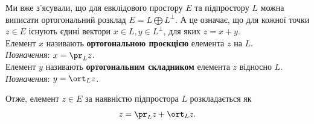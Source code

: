 \documentclass{math_library}
\begin{document}
\begin{definition}
Ми вже з'ясували, що для евклідового простору $E$ та підпростору $L$ можна виписати ортогональний розклад $E = L \bigoplus L^\perp$. А це означає, що для кожної точки $z \in E$ існують єдині вектори $x \in L, y \in L^\perp$, для яких $z = x+y$.\\
Елемент $x$ називають \textbf{ортогональною проєкцією} елемента $z$ на $L$.\\
\textit{Позначення}: $x = \pr_L z$.\\
Елемент $y$ називають \textbf{ортогональним складником} елемента $z$ відносно $L$.\\
\textit{Позначення}: $y = \ort_L z$.
\end{definition}

\begin{remark}
Отже, елемент $z \in E$ за наявністю підпростора $L$ розкладається як
\begin{align*}
z = \pr_L z + \ort_L z.
\end{align*}
\end{remark}
\end{document}
